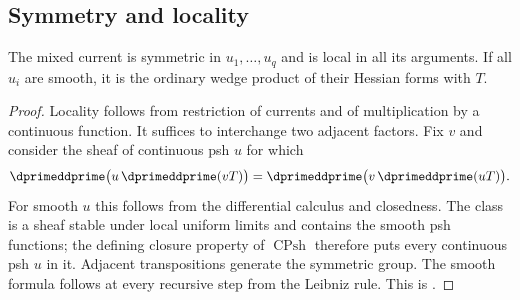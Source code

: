 \subsection{Symmetry and locality}
\label{sec:ch16-symmetry}

\begin{theorem}
\label{thm:bt-symmetry-locality}
The mixed current is symmetric in $u_1,\ldots,u_q$ and is local in all its
arguments.  If all $u_i$ are smooth, it is the ordinary wedge product of
their Hessian forms with $T$.
\end{theorem}
\begin{proof}
Locality follows from restriction of currents and of multiplication by a
continuous function.  It suffices to interchange two adjacent factors.  Fix
$v$ and consider the sheaf of continuous psh $u$ for which
\[
 \dprimeddprime\bigl(u\,\dprimeddprime(vT)\bigr)
 =\dprimeddprime\bigl(v\,\dprimeddprime(uT)\bigr).
\]
For smooth $u$ this follows from the differential calculus and closedness.
The class is a sheaf stable under local uniform limits and contains the
smooth psh functions; the defining closure property of
$\operatorname{CPsh}$ therefore puts every continuous psh $u$ in it.
Adjacent transpositions generate the symmetric group.  The smooth formula
follows at every recursive step from the Leibniz rule.  This is
\cite[Proposition~8.7.4]{CLD25}.
\end{proof}

